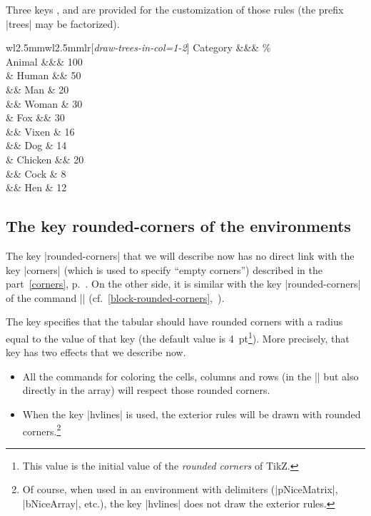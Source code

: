\documentclass[dvipsnames]{article}
\begin{document}
\bigskip
Three keys ,  and
 are provided for the customization of those rules
(the prefix |trees| may be factorized).

\medskip
\begin{Code}
\renewcommand{\arraystretch}{1.3}
\begin{NiceTabular}{w{l}{2.5mm}w{l}{2.5mm}lr}[\emph{draw-trees-in-col=1-2}]
\toprule
  Category &&&  \% \\
\midrule
  Animal   &&& 100 \\
  & Human   &&  50 \\
  && Man     &  20 \\
  && Woman   &  30 \\
  & Fox     &&  30 \\
  && Vixen   &  16 \\
  && Dog     &  14 \\
  & Chicken &&  20 \\
  && Cock    &   8 \\
  && Hen     &  12 \\
\bottomrule
\end{NiceTabular}
\end{Code}



\subsection{The key rounded-corners of the environments}

\label{tabular-rounded-corners}

The key |rounded-corners| that we will describe now has no direct link with
the key |corners| (which is used to specify ``empty corners'') described in
the part~\ref{corners}, p.~\pageref{corners}. On the other side, it is similar with the
key |rounded-corners| of the command |\Block|
(cf.~\ref{block-rounded-corners},~\pageref{block-rounded-corners}).

\smallskip
The key  specifies that the tabular should have
rounded corners with a radius equal to the value of that key (the default value is
4~pt\footnote{This value is the initial value of the \emph{rounded corners} of
  TikZ.}). More precisely, that key has two effects that we describe now.
\begin{itemize}
\item All the commands for coloring the cells, columns and rows (in the
|\CodeBefore| but also directly in the array) will respect those rounded corners. 

\item When the key |hvlines| is used, the exterior rules will be drawn with
rounded corners.\footnote{Of course, when used in an environment with delimiters
(|{pNiceMatrix}|, |{bNiceArray}|, etc.), the key |hvlines| does not draw the
exterior rules.}
\end{itemize}
\end{document}
